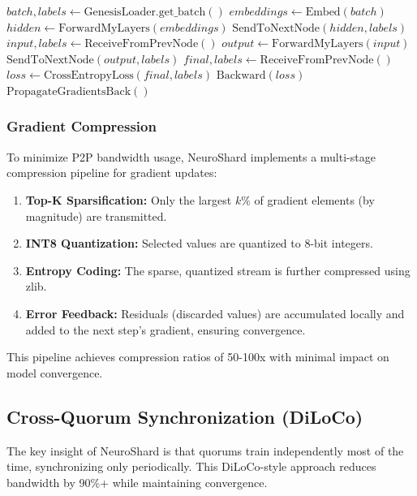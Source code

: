 \documentclass[11pt,a4paper]{article}
\begin{document}
\begin{algorithm}[H]
\caption{Quorum Pipeline Training}
\begin{algorithmic}[1]
        \State $batch, labels \gets \text{GenesisLoader.get\_batch}()$
        \State $embeddings \gets \text{Embed}(batch)$
        \State $hidden \gets \text{ForwardMyLayers}(embeddings)$
        \State $\text{SendToNextNode}(hidden, labels)$
        \State $input, labels \gets \text{ReceiveFromPrevNode}()$
        \State $output \gets \text{ForwardMyLayers}(input)$
        \State $\text{SendToNextNode}(output, labels)$
        \State $final, labels \gets \text{ReceiveFromPrevNode}()$
        \State $loss \gets \text{CrossEntropyLoss}(final, labels)$
        \State $\text{Backward}(loss)$
        \State $\text{PropagateGradientsBack}()$
    \EndIf
\EndProcedure
\end{algorithmic}
\end{algorithm}

\subsubsection{Gradient Compression}
To minimize P2P bandwidth usage, NeuroShard implements a multi-stage compression pipeline for gradient updates:
\begin{enumerate}
    \item \textbf{Top-K Sparsification:} Only the largest $k\%$ of gradient elements (by magnitude) are transmitted.
    \item \textbf{INT8 Quantization:} Selected values are quantized to 8-bit integers.
    \item \textbf{Entropy Coding:} The sparse, quantized stream is further compressed using zlib.
    \item \textbf{Error Feedback:} Residuals (discarded values) are accumulated locally and added to the next step's gradient, ensuring convergence.
\end{enumerate}
This pipeline achieves compression ratios of 50-100x with minimal impact on model convergence.

\subsection{Cross-Quorum Synchronization (DiLoCo)}

The key insight of NeuroShard is that quorums train independently most of the time, synchronizing only periodically. This DiLoCo-style approach reduces bandwidth by 90\%+ while maintaining convergence.
\end{document}
